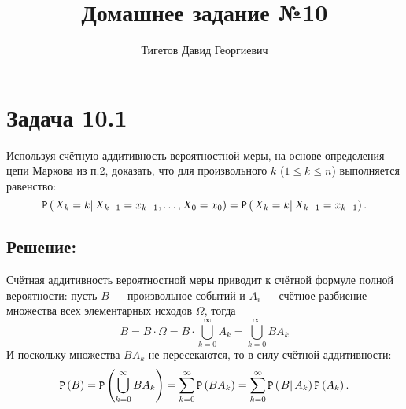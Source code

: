 \documentclass[12pt]{article}
\begin{document}
    \title{Домашнее задание №10}
    \author{Тигетов Давид Георгиевич}
    \date{}
    \maketitle

    \section*{Задача 10.1}
    Используя счётную аддитивность вероятностной меры, на основе определения цепи Маркова из п.2, доказать, что для произвольного $k$ ($1 \le k \le n$) выполняется равенство:
    \[
        \mathtt{P} \left ( \left . {X_k = k} \right | {X_{k-1} = x_{k-1}, \dots, X_0 = x_0} \right ) = \mathtt{P} \left ( \left . {X_k = k} \right | {X_{k-1} = x_{k-1}} \right ).
    \]

    \subsection*{Решение:}
    Счётная аддитивность вероятностной меры приводит к счётной формуле полной вероятности: пусть $B$ --- произвольное событий и $A_i$ --- счётное разбиение множества всех элементарных исходов
    $\Omega$, тогда
    \[
        B
        = B \cdot \Omega
        = B \cdot \bigcup_{k=0}^{\infty} A_k
        = \bigcup_{k=0}^{\infty} B A_k
    \]
    И поскольку множества $B A_k$ не пересекаются, то в силу счётной аддитивности:
    \[
        \mathtt{P} \left ( B \right )
        = \mathtt{P} \left ( \bigcup_{k=0}^{\infty} B A_k \right )
        = \sum_{k=0}^{\infty} \mathtt{P} \left ( B A_k \right )
        = \sum_{k=0}^{\infty} \mathtt{P} \left ( \left . {B} \right | {A_k} \right ) \mathtt{P} \left ( A_k \right ) .
    \]
\end{document}
